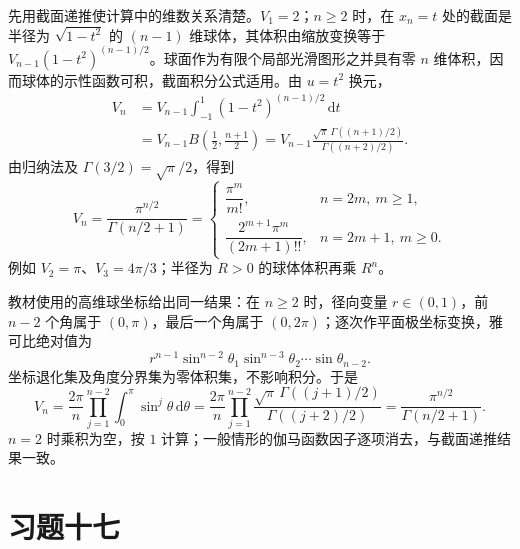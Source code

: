 \documentclass[UTF8,12pt,a4paper,fontset=fandol]{ctexbook}
\begin{document}
\begin{solve}
先用截面递推使计算中的维数关系清楚。$V_1=2$；$n\geq2$ 时，在 $x_n=t$ 处的截面是半径为 $\sqrt{1-t^2}$ 的 $(n-1)$ 维球体，其体积由缩放变换等于 $V_{n-1}(1-t^2)^{(n-1)/2}$。球面作为有限个局部光滑图形之并具有零 $n$ 维体积，因而球体的示性函数可积，截面积分公式适用。由 $u=t^2$ 换元，
\begin{align*}
    V_n&=V_{n-1}\int_{-1}^1(1-t^2)^{(n-1)/2}\,\mathrm{d}t\\
       &=V_{n-1}B\left(\frac12,\frac{n+1}{2}\right)
        =V_{n-1}\frac{\sqrt\pi\,\Gamma((n+1)/2)}{\Gamma((n+2)/2)}.
\end{align*}
由归纳法及 $\Gamma(3/2)=\sqrt\pi/2$，得到
\begin{equation}
    V_n=\frac{\pi^{n/2}}{\Gamma(n/2+1)}
    =\begin{cases}
       \dfrac{\pi^m}{m!},&n=2m,\ m\geq1,\\
       \dfrac{2^{m+1}\pi^m}{(2m+1)!!},&n=2m+1,\ m\geq0.
     \end{cases}
    \label{eq:gamma-unit-ball-volume}
\end{equation}
例如 $V_2=\pi$、$V_3=4\pi/3$；半径为 $R>0$ 的球体体积再乘 $R^n$。

教材使用的高维球坐标给出同一结果：在 $n\geq2$ 时，径向变量 $r\in(0,1)$，前 $n-2$ 个角属于 $(0,\pi)$，最后一个角属于 $(0,2\pi)$；逐次作平面极坐标变换，雅可比绝对值为
\[
    r^{n-1}\sin^{n-2}\theta_1\sin^{n-3}\theta_2\cdots\sin\theta_{n-2}.
\]
坐标退化集及角度分界集为零体积集，不影响积分。于是
\[
    V_n=\frac{2\pi}{n}\prod_{j=1}^{n-2}
         \int_0^\pi\sin^j\theta\,\mathrm{d}\theta
       =\frac{2\pi}{n}\prod_{j=1}^{n-2}
         \frac{\sqrt\pi\,\Gamma((j+1)/2)}{\Gamma((j+2)/2)}
       =\frac{\pi^{n/2}}{\Gamma(n/2+1)}.
\]
$n=2$ 时乘积为空，按 $1$ 计算；一般情形的伽马函数因子逐项消去，与截面递推结果一致。
\end{solve}

\section*{习题十七}
\end{document}
